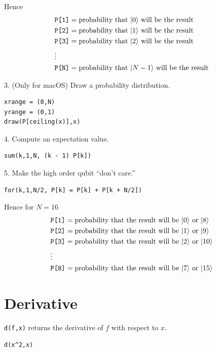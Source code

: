\documentclass[12pt]{article}
\begin{document}
Hence
\begin{align*}
&\text{\tt P[1]}=\text{probability that $|0\rangle$ will be the result}
\\
&\text{\tt P[2]}=\text{probability that $|1\rangle$ will be the result}
\\
&\text{\tt P[3]}=\text{probability that $|2\rangle$ will be the result}
\\
&\vdots
\\
&\text{\tt P[N]}=\text{probability that $|N-1\rangle$ will be the result}
\end{align*}

3. (Only for macOS) Draw a probability distribution.
{\color{blue}
\begin{verbatim}
xrange = (0,N)
yrange = (0,1)
draw(P[ceiling(x)],x)
\end{verbatim}
}

4. Compute an expectation value.
{\color{blue}
\begin{verbatim}
sum(k,1,N, (k - 1) P[k])
\end{verbatim}
}

5. Make the high order qubit ``don't care.''
{\color{blue}
\begin{verbatim}
for(k,1,N/2, P[k] = P[k] + P[k + N/2])
\end{verbatim}
}

Hence for $N=16$
\begin{align*}
&\text{\tt P[1]}=\text{probability that the result will be $|0\rangle$ or $|8\rangle$}
\\
&\text{\tt P[2]}=\text{probability that the result will be $|1\rangle$ or $|9\rangle$}
\\
&\text{\tt P[3]}=\text{probability that the result will be $|2\rangle$ or $|10\rangle$}
\\
&\vdots
\\
&\text{\tt P[8]}=\text{probability that the result will be $|7\rangle$ or $|15\rangle$}
\end{align*}

\newpage

\section{Derivative}

\verb$d(f,x)$ returns the derivative of $f$ with respect to $x$.

{\color{blue}
\begin{verbatim}
d(x^2,x)
\end{verbatim}}
\end{document}
